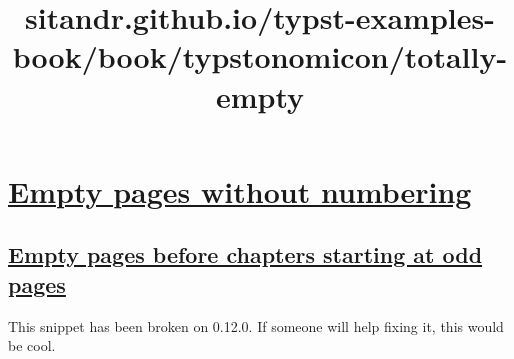 \title{sitandr.github.io/typst-examples-book/book/typstonomicon/totally-empty}

\section{\texorpdfstring{\hyperref[empty-pages-without-numbering]{Empty
pages without
numbering}}{Empty pages without numbering}}\label{empty-pages-without-numbering}

\subsection{\texorpdfstring{\hyperref[empty-pages-before-chapters-starting-at-odd-pages]{Empty
pages before chapters starting at odd
pages}}{Empty pages before chapters starting at odd pages}}\label{empty-pages-before-chapters-starting-at-odd-pages}

This snippet has been broken on 0.12.0. If someone will help fixing it,
this would be cool.

